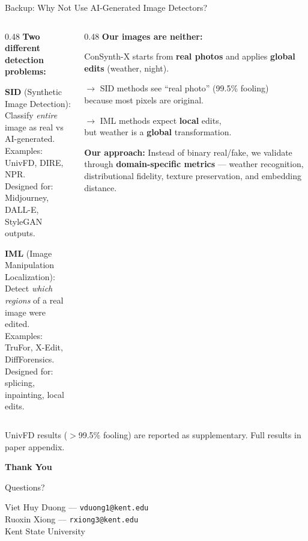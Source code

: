 \documentclass[aspectratio=169, 11pt]{beamer}
\begin{document}
\begin{frame}{Backup: Why Not Use AI-Generated Image Detectors?}

\begin{columns}[T]
\begin{column}{0.48\textwidth}
\textbf{Two different detection problems:}

\vspace{0.3em}
\textbf{SID} (Synthetic Image Detection):\\
{\small Classify \textit{entire} image as real vs AI-generated.\\
Examples: UnivFD, DIRE, NPR.\\
Designed for: Midjourney, DALL-E, StyleGAN outputs.}

\vspace{0.3em}
\textbf{IML} (Image Manipulation Localization):\\
{\small Detect \textit{which regions} of a real image were edited.\\
Examples: TruFor, X-Edit, DiffForensics.\\
Designed for: splicing, inpainting, local edits.}
\end{column}
\begin{column}{0.48\textwidth}
\textbf{Our images are neither:}

\vspace{0.3em}
ConSynth-X starts from \textbf{real photos} and applies \textbf{global edits} (weather, night).

\vspace{0.3em}
$\to$ SID methods see ``real photo'' (99.5\% fooling)\\because most pixels are original.

\vspace{0.3em}
$\to$ IML methods expect \textbf{local} edits,\\but weather is a \textbf{global} transformation.

\vspace{0.5em}
\textbf{Our approach:} Instead of binary real/fake, we validate through \textbf{domain-specific metrics} --- weather recognition, distributional fidelity, texture preservation, and embedding distance.
\end{column}
\end{columns}

\vspace{0.3em}
{\footnotesize UnivFD results ($>$99.5\% fooling) are reported as supplementary. Full results in paper appendix.}
\end{frame}

\begin{frame}{}
\centering
\vspace{2cm}
{\Huge\bfseries Thank You}

\vspace{1cm}
{\large Questions?}

\vspace{1cm}
{\footnotesize
Viet Huy Duong --- \texttt{vduong1@kent.edu}\\
Ruoxin Xiong --- \texttt{rxiong3@kent.edu}\\
Kent State University
}
\end{frame}
\end{document}
